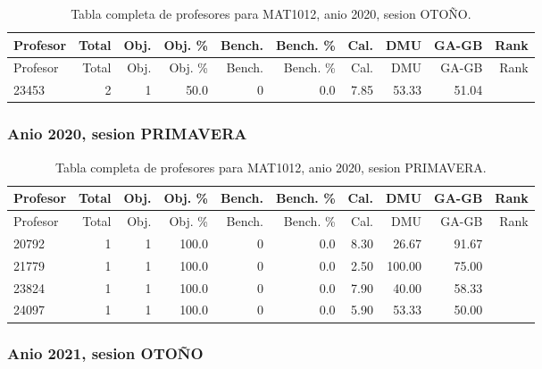 \begingroup
\scriptsize
\setlength{\tabcolsep}{3pt}
\begin{longtable}{lrrrrrrrrr}
\caption{Tabla completa de profesores para MAT1012, anio 2020, sesion OTOÑO.}\label{tab:prof-period-mat1012-2020-oto-o}\\
\toprule
Profesor & Total & Obj. & Obj. \% & Bench. & Bench. \% & Cal. & DMU & GA-GB & Rank \\
\midrule
\endfirsthead
\toprule
Profesor & Total & Obj. & Obj. \% & Bench. & Bench. \% & Cal. & DMU & GA-GB & Rank \\
\midrule
\endhead
23453 & 2 & 1 & 50.0 & 0 & 0.0 & 7.85 & 53.33 & 51.04 &  \\
\bottomrule
\end{longtable}
\endgroup

\subsubsection{Anio 2020, sesion PRIMAVERA}

\begingroup
\scriptsize
\setlength{\tabcolsep}{3pt}
\begin{longtable}{lrrrrrrrrr}
\caption{Tabla completa de profesores para MAT1012, anio 2020, sesion PRIMAVERA.}\label{tab:prof-period-mat1012-2020-primavera}\\
\toprule
Profesor & Total & Obj. & Obj. \% & Bench. & Bench. \% & Cal. & DMU & GA-GB & Rank \\
\midrule
\endfirsthead
\toprule
Profesor & Total & Obj. & Obj. \% & Bench. & Bench. \% & Cal. & DMU & GA-GB & Rank \\
\midrule
\endhead
20792 & 1 & 1 & 100.0 & 0 & 0.0 & 8.30 & 26.67 & 91.67 &  \\
21779 & 1 & 1 & 100.0 & 0 & 0.0 & 2.50 & 100.00 & 75.00 &  \\
23824 & 1 & 1 & 100.0 & 0 & 0.0 & 7.90 & 40.00 & 58.33 &  \\
24097 & 1 & 1 & 100.0 & 0 & 0.0 & 5.90 & 53.33 & 50.00 &  \\
\bottomrule
\end{longtable}
\endgroup

\subsubsection{Anio 2021, sesion OTOÑO}

